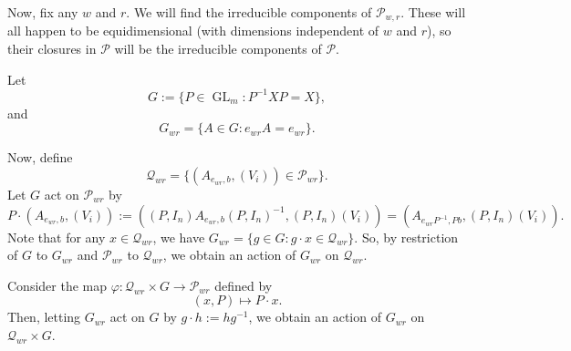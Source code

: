 \documentclass[12pt,psamsfonts]{article}
\DeclareMathOperator{\GL}{GL}
\begin{document}
Now, fix any \(w\) and \(r\).
We will find the irreducible components of \(\mathcal{P}_{w,r}\).
These will all happen to be equidimensional (with dimensions independent of \(w\) and \(r\)), so their closures in \(\mathcal{P}\) will be the irreducible components of \(\mathcal{P}\).
\par Let 
\[G := \{P \in \GL_m : P^{-1} X P = X\},\]
and
\[G_{wr} = \{A \in G : e_{wr}A = e_{wr}\}.\]
\par Now, define 
\[\mathcal{Q}_{wr} = \{(A_{e_{wr}, b}, (V_i)) \in \mathcal{P}_{wr}\}.\]
Let \(G\) act on \(\mathcal{P}_{wr}\) by
\[P \cdot (A_{e_{wr},b}, (V_i)) := ((P, I_n) A_{e_{wr}, b} (P, I_n)^{-1}, (P, I_n)(V_i)) = (A_{e_{wr} P^{-1}, Pb}, (P, I_n) (V_i)).\]
Note that for any \(x \in \mathcal{Q}_{wr}\), we have \(G_{wr} = \{g \in G : g \cdot x \in \mathcal{Q}_{wr}\}\).
So, by restriction of \(G\) to \(G_{wr}\) and \(\mathcal{P}_{wr}\) to \(\mathcal{Q}_{wr}\), we obtain an action of \(G_{wr}\) on \(\mathcal{Q}_{wr}\).
\par Consider the map \(\varphi : \mathcal{Q}_{wr} \times G \to \mathcal{P}_{wr}\) defined by
\[(x, P) \mapsto P \cdot x.\]
Then, letting \(G_{wr}\) act on \(G\) by \(g \cdot h := hg^{-1}\), we obtain an action of \(G_{wr}\) on \(\mathcal{Q}_{wr} \times G\).
\end{document}

